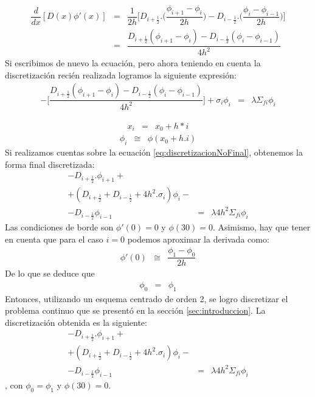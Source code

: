 \documentclass[11pt,a4paper]{emulateapj}
\begin{document}
\begin{eqnarray}
\label{eq:desarrolloDeLaDiscretizacion2}
	\dfrac{d}{dx}[D(x) \phi'(x)] &=& \dfrac{1}{2h} \bigg[	D_{i+\frac{1}{2}}.\bigg(\dfrac{\phi_{i+1} - \phi_{i}}{2h}\bigg) 	-
			D_{i-\frac{1}{2}}.\bigg(\dfrac{\phi_{i} - \phi_{i-1}}{2h}\bigg) \bigg]	\\
\label{eq:reemplazoDeLaDerivada}
	&=&\dfrac{D_{i+\frac{1}{2}}(\phi_{i+1} - \phi_{i}) - D_{i-\frac{1}{2}}(\phi_{i} - \phi_{i-1})}{4h^2}
\end{eqnarray}
Si escribimos de nuevo la ecuación, pero ahora teniendo en cuenta la discretización recién realizada logramos la siguiente expresión:
\begin{eqnarray}
\label{eq:discretizacionNoFinal}
	-\bigg[\dfrac{D_{i+\frac{1}{2}}(\phi_{i+1} - \phi_{i}) - D_{i-\frac{1}{2}}(\phi_{i} - \phi_{i-1})}{4h^2}\bigg]
	+ \sigma_i \phi_i &=& \lambda \Sigma_{fi} \phi_i
\end{eqnarray}



\begin{eqnarray}
	x_i &=&x_0 + h*i
\end{eqnarray}
\begin{eqnarray}
	\phi_i &\cong&\phi(x_0 + h.i)
\end{eqnarray}
Si realizamos cuentas sobre la ecuación \ref{eq:discretizacionNoFinal}, obtenemos la forma final discretizada:
\begin{eqnarray}
	-D_{i+\frac{1}{2}}.\phi_{i+1} + \\
	+(D_{i+\frac{1}{2}} + D_{i-\frac{1}{2}} + 4h^2.\sigma_i)\phi_{i} - \\
	-D_{i-\frac{1}{2}}\phi_{i-1} &=& \lambda 4h^2 \Sigma_{fi} \phi_i
\end{eqnarray}
Las condiciones de borde son $\phi'(0) = 0$ y $\phi(30) = 0$. Asimismo, hay que tener en cuenta que para el caso $i = 0$ podemos aproximar la derivada como:
\begin{eqnarray}
	\phi'(0) &\cong & \dfrac{\phi_1 - \phi_0}{2h}
\end{eqnarray}
De lo que se deduce que
\begin{eqnarray}
	\phi_0 &=& \phi_1
\end{eqnarray}
Entonces, utilizando un esquema centrado de orden 2, se logro discretizar el problema continuo que se presentó en la sección \ref{sec:introduccion}. La discretización obtenida es la siguiente:
\begin{eqnarray}
	-D_{i+\frac{1}{2}}.\phi_{i+1} + \\
	+(D_{i+\frac{1}{2}} + D_{i-\frac{1}{2}} + 4h^2.\sigma_i)\phi_{i} - \\
	-D_{i-\frac{1}{2}}\phi_{i-1} &=& \lambda 4h^2 \Sigma_{fi} \phi_i
\end{eqnarray}
, con $\phi_0 = \phi_1$ y $\phi(30) = 0$.
\end{document}
